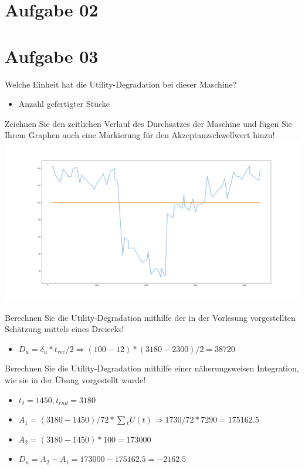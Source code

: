 \documentclass{ocbeameruni}
\begin{document}
\section{Aufgabe 02}


\section{Aufgabe 03}

\begin{frame}{3.1}
Welche Einheit hat die Utility-Degradation bei dieser Maschine?
    \begin{itemize}
    \item Anzahl gefertigter Stücke
    \end{itemize}
\end{frame}

\begin{frame}{3.2}
    \begin{center}
Zeichnen Sie den zeitlichen Verlauf des Durchsatzes der Maschine und fügen Sie Ihrem Graphen
auch eine Markierung für den Akzeptanzschwellwert hinzu!
    \includegraphics[scale=0.16]{oc_3-2.png}
    \end{center}
\end{frame}

\begin{frame}{3.3}
Berechnen Sie die Utility-Degradation mithilfe der in der Vorlesung vorgestellten Schätzung
mittels eines Dreiecks!
    \begin{itemize}
    \item $D_u = \delta{_u} * t_{rec} / 2 \Rightarrow (100-12) * (3180-2300) / 2 = 38720$
    \end{itemize}
\end{frame}

\begin{frame}{3.4}
Berechnen Sie die Utility-Degradation mithilfe einer näherungsweisen Integration, wie sie in
der Übung vorgestellt wurde!
    \begin{itemize}
    \item $t_{\delta} = 1450, t_{end} = 3180$
    \item $A_1 = (3180-1450)/72 * \sum{_t} U(t) \Rightarrow 1730/72*7290 = 175162.5$
    \item $A_2 = (3180-1450)*100 = 173000$
    \item $D_u = A_2 - A_1 = 173000 - 175162.5 = - 2162.5$
    \end{itemize}
\end{frame}
\end{document}
